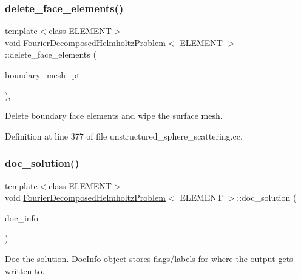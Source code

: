\subsubsection{\texorpdfstring{delete\+\_\+face\+\_\+elements()}{delete\_face\_elements()}}
{\footnotesize\ttfamily template$<$class E\+L\+E\+M\+E\+NT$>$ \\
void \hyperlink{classFourierDecomposedHelmholtzProblem}{Fourier\+Decomposed\+Helmholtz\+Problem}$<$ E\+L\+E\+M\+E\+NT $>$\+::delete\+\_\+face\+\_\+elements (\begin{DoxyParamCaption}\item[{Mesh $\ast$const \&}]{boundary\+\_\+mesh\+\_\+pt }\end{DoxyParamCaption})\hspace{0.3cm}{\ttfamily [inline]}, {\ttfamily [private]}}



Delete boundary face elements and wipe the surface mesh. 



Definition at line 377 of file unstructured\+\_\+sphere\+\_\+scattering.\+cc.

\mbox{\label{classFourierDecomposedHelmholtzProblem_a893efb01f8f1d254315201121766d882}} 
\subsubsection{\texorpdfstring{doc\+\_\+solution()}{doc\_solution()}\hspace{0.1cm}{\footnotesize\ttfamily [1/2]}}
{\footnotesize\ttfamily template$<$class E\+L\+E\+M\+E\+NT$>$ \\
void \hyperlink{classFourierDecomposedHelmholtzProblem}{Fourier\+Decomposed\+Helmholtz\+Problem}$<$ E\+L\+E\+M\+E\+NT $>$\+::doc\+\_\+solution (\begin{DoxyParamCaption}\item[{Doc\+Info \&}]{doc\+\_\+info }\end{DoxyParamCaption})}



Doc the solution. Doc\+Info object stores flags/labels for where the output gets written to. 

\mbox{\label{classFourierDecomposedHelmholtzProblem_a893efb01f8f1d254315201121766d882}} 
